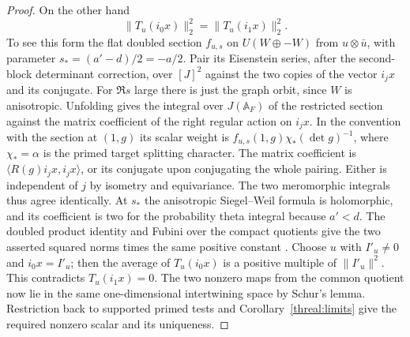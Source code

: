 \begin{proof}
On the other hand
\[
                 \|T_u(i_0x)\|_2^2=\|T_u(i_1x)\|_2^2.
\]
To see this form the flat doubled section \(f_{u,s}\) on
\(U(W\oplus -W)\) from \(u\otimes\bar u\), with parameter
\(s_*=(a'-d)/2=-a/2\). Pair its Eisenstein series, after the
second-block determinant correction, over \([J]^2\) against the
two copies of the vector \(i_jx\) and its conjugate. For \(\Re s\)
large there is just the graph orbit, since \(W\) is anisotropic.
Unfolding gives the integral over \(J(\mathbb A_F)\) of the
restricted section against the matrix coefficient of the right
regular action on \(i_jx\). In the convention with the section at
\((1,g)\) its scalar weight is \(f_{u,s}(1,g)\chi_*(\det g)^{-1}\),
where \(\chi_*=\alpha\) is the primed target splitting character.
The matrix coefficient is \(\langle R(g)i_jx,i_jx\rangle\), or
its conjugate upon conjugating the whole pairing. Either is
independent of \(j\) by isometry and equivariance. The two
meromorphic integrals thus agree identically. At \(s_*\) the
anisotropic Siegel--Weil formula is holomorphic, and its coefficient
is two for the probability theta integral because \(a'<d\).
The doubled product identity and Fubini over the compact quotients
give the two asserted squared norms times the same positive constant
\cite[Theorem~7.1 and \S11.3]{ganQiuTakeda}. Choose \(u\) with
\(I'_u\ne0\) and \(i_0x=I'_u\); then the average of
\(T_u(i_0x)\) is a positive multiple of \(\|I'_u\|^2\).
This contradicts \(T_u(i_1x)=0\). The two nonzero maps from the
common quotient now lie in the same one-dimensional intertwining
space by Schur's lemma. Restriction back to supported primed tests
and Corollary~\ref{threal:limits} give the required nonzero scalar
and its uniqueness.
\end{proof}

